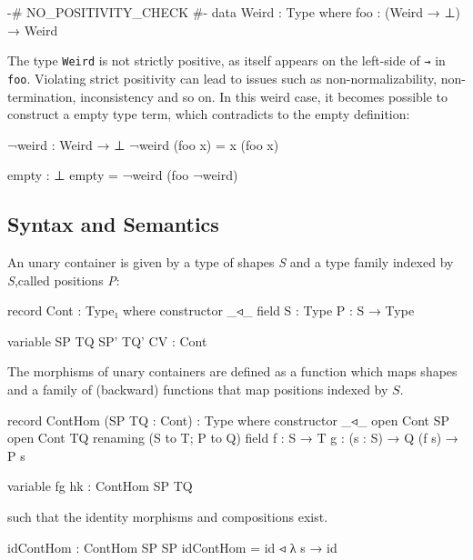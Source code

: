 {\begin{code}
{-# NO_POSITIVITY_CHECK #-}
data Weird : Type where
  foo : (Weird → ⊥) → Weird
\end{code}

The type \texttt{Weird} is not strictly positive, as itself appears on the left-side of \texttt{→} in \texttt{foo}. Violating strict positivity can lead to issues such as non-normalizability, non-termination, inconsistency and so on. In this weird case, it becomes possible to construct a empty type term, which contradicts to the empty definition:

\begin{code}
¬weird : Weird → ⊥
¬weird (foo x) = x (foo x)

empty : ⊥
empty = ¬weird (foo ¬weird)
\end{code}

\subsection{Syntax and Semantics}

An unary container is given by a type of shapes \textit{S} and a type family indexed by \textit{S},called positions \textit{P}:

\begin{code}
record Cont : Type₁ where
  constructor _◃_
  field
    S : Type
    P : S → Type
\end{code}

\begin{code}[hide]
variable SP TQ SP' TQ' CV : Cont
\end{code}

The morphisms of unary containers are defined as a function which maps shapes and a family of (backward) functions that map positions indexed by $S$.

\begin{code}
record ContHom (SP TQ : Cont) : Type where
  constructor _◃_
  open Cont SP
  open Cont TQ renaming (S to T; P to Q)
  field
    f : S → T
    g : (s : S) → Q (f s) → P s
\end{code}

\begin{code}[hide]
variable fg hk : ContHom SP TQ
\end{code}

such that the identity morphisms and compositions exist.

\begin{code}
idContHom : ContHom SP SP
idContHom = id ◃ λ s → id


\end{code}}
